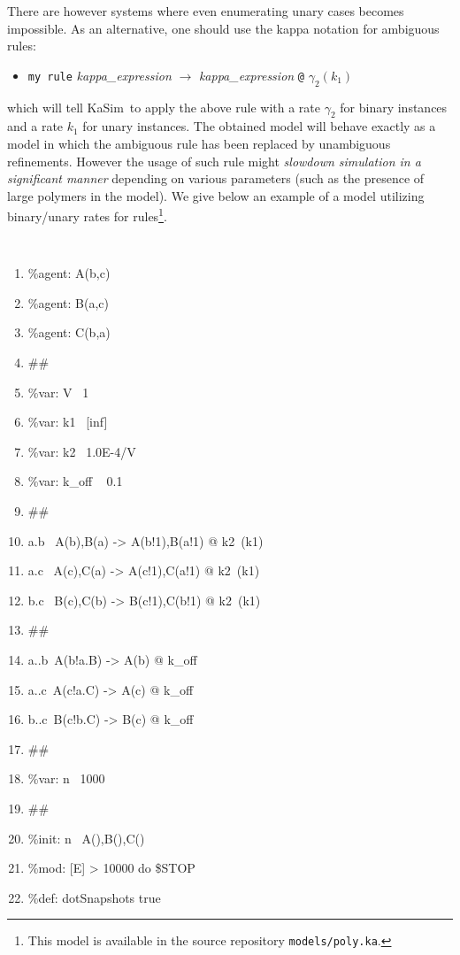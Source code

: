 \documentclass[11pt]{book}
\def\KaSim{\textsf{KaSim}}
\def\ttt#1{\texttt{#1}}
\def\var#1{\textquotesingle #1\textquotesingle}
\def\rar{\rightarrow}
\def\ga{\gamma}
\def\ITE#1{\begin{itemize}#1\end{itemize}}
\begin{document}
There are however systems where even enumerating unary cases becomes impossible. As an alternative, one should use the kappa notation for ambiguous rules: 
\ITE{
\item[] \ttt{\textquotesingle my rule\textquotesingle } {\it kappa\_expression} $\rar$ {\it kappa\_expression} \ttt{@} $\ga_2(k_1)$  
}
which will tell \KaSim~to apply the above rule with a rate $\ga_2$ for binary instances and a rate $k_1$ for unary instances. The obtained model will behave exactly as a model in which the ambiguous rule has been replaced by unambiguous refinements. However the usage of such rule might \emph{slowdown simulation in a significant manner} depending on various parameters (such as the presence of large polymers in the model). We give below an example of a model utilizing binary/unary rates for rules\footnote{This model is available in the source repository \ttt{models/poly.ka}.}.

{\tt\footnotesize
\begin{enumerate}
\item \%agent: A(b,c)
\item \%agent: B(a,c)
\item \%agent: C(b,a)
\item \#\#
\item \%var: \var{V}~  1
\item \%var: \var{k1}~  [inf]
\item \%var: \var{k2}~ 1.0E-4/\var{V} 
\item \%var: \var{k\_off} ~ 0.1
\item \#\#
\item \var{a.b}~ A(b),B(a) -> A(b!1),B(a!1) @ \var{k2}~(\var{k1})
\item \var{a.c}~ A(c),C(a) -> A(c!1),C(a!1) @ \var{k2}~(\var{k1})
\item \var{b.c}~ B(c),C(b) -> B(c!1),C(b!1) @ \var{k2}~(\var{k1})
\item \#\#
\item \var{a..b}~A(b!a.B) -> A(b) @ \var{k\_off} 
\item \var{a..c}~A(c!a.C) -> A(c) @ \var{k\_off}
\item \var{b..c}~B(c!b.C) -> B(c) @ \var{k\_off} 
\item \#\#
\item \%var: \var{n}~  1000
\item \#\#
\item \%init: \var{n}~  A(),B(),C()
\item \%mod: [E] > 10000 do \$STOP 
\item \%def: \var{\var{dotSnapshots}} \var{\var{true}}
\end{enumerate}
}
\end{document}
